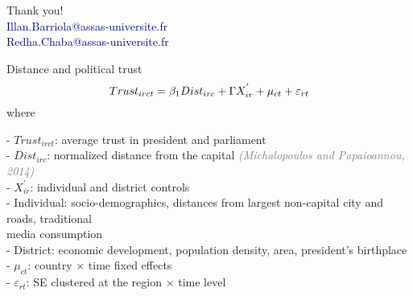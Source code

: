 \documentclass[aspectratio=169,xcolor=dvipsnames]{beamer}
\begin{document}
\begin{frame}
    \begin{center}
        \Large Thank you!\\
        \vspace{1em}
        \textcolor{DarkBlue}{Illan.Barriola@assas-universite.fr}\\
        \vspace{1em}
        \textcolor{DarkBlue}{Redha.Chaba@assas-universite.fr}
    \end{center}
\end{frame}





\begin{frame}[noframenumbering]{Distance and political trust}
\begin{equation}
    \fontsize{10}{11}\selectfont
    Trust_{irct} = \beta_{1} Dist_{irc} + \Gamma X^{'}_{ir} + \mu_{ct}+ \varepsilon_{rt}
    \end{equation}
\vfill
\hspace{1em}
where\\
\vfill
    {\fontsize{9}{12}\selectfont
\begin{flushleft}
\hspace{2.5em}
    - $Trust_{irct}$: average trust in president and parliament\\
    \vfill
\hspace{2.5em}
    - $Dist_{irc}$: normalized distance from the capital \textcolor{gray}{\textit{(Michalopoulos and Papaioannou, 2014)}}\\
    \vfill
 \hspace{2.5em}
   - $X^{'}_{ir}$: individual and district controls\\ \vfill
 \hspace{5em}
- Individual: socio-demographics, distances from largest non-capital city and roads, traditional\\
 \hspace{10.3em}
 media consumption\\
\hspace{5em}
- District: economic development, population density, area, president's birthplace\\    \vfill
\hspace{2.5em}
    - $\mu_{ct}$: country $\times$ time fixed effects\\ \vfill
\hspace{2.5em}
    - $\varepsilon_{rt}$: SE clustered at the region $\times$ time level
\end{flushleft}
    }
\end{frame}
\end{document}
